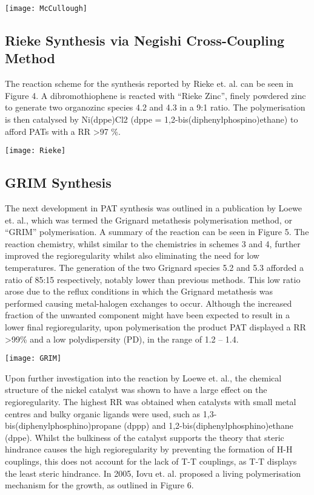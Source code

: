 \texttt{[image: McCullough]}

\subsection{Rieke Synthesis via Negishi Cross-Coupling Method}

The reaction scheme for the synthesis reported by Rieke et. al. can be seen in Figure 4. A dibromothiophene is reacted with “Rieke Zinc”, finely powdered zinc to generate two organozinc species 4.2 and 4.3 in a 9:1 ratio. The polymerisation is then catalysed by Ni(dppe)Cl2 (dppe = 1,2-bis(diphenylphospino)ethane) to afford PATs with a RR \textgreater 97 \%.

\texttt{[image: Rieke]}

\subsection{GRIM Synthesis}

The next development in PAT synthesis was outlined in a publication by Loewe et. al., which was termed the Grignard metathesis polymerisation method, or “GRIM” polymerisation. A summary of the reaction can be seen in Figure 5.  The reaction chemistry, whilst similar to the chemistries in schemes 3 and 4, further improved the regioregularity whilst also eliminating the need for low temperatures. The generation of the two Grignard species 5.2 and 5.3 afforded a ratio of 85:15 respectively, notably lower than previous methods. This low ratio arose due to the reflux conditions in which the Grignard metathesis was performed causing metal-halogen exchanges to occur. Although the increased fraction of the unwanted component might have been expected to result in a lower final regioregularity, upon polymerisation the product PAT displayed a RR \textgreater 99\% and a low polydispersity (PD), in the range of 1.2 – 1.4.

\texttt{[image: GRIM]}

Upon further investigation into the reaction by Loewe et. al., the chemical structure of the nickel catalyst was shown to have a large effect on the regioregularity. The highest RR was obtained when catalysts with small metal centres and bulky organic ligands were used, such as 1,3-bis(diphenylphosphino)propane (dppp) and 1,2-bis(diphenylphosphino)ethane (dppe). Whilst the bulkiness of the catalyst supports the theory that steric hindrance causes the high regioregularity by preventing the formation of H-H couplings, this does not account for the lack of T-T couplings, as T-T displays the least steric hindrance. In 2005, Iovu et. al. proposed a living polymerisation mechanism for the growth, as outlined in Figure 6.

